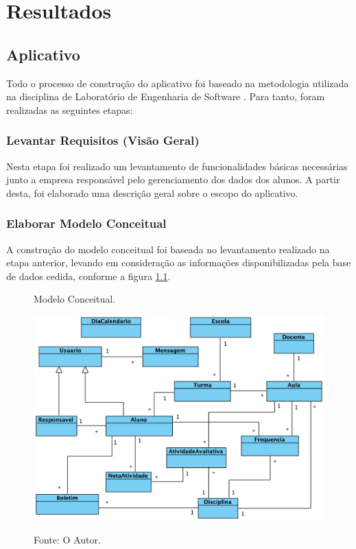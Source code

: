\chapter{\textbf{Resultados}} %
\sloppy %

\section{Aplicativo}

Todo o processo de construção do aplicativo foi baseado na metodologia utilizada na disciplina de Laboratório de Engenharia de Software \cite{rupLes}. Para tanto, foram realizadas as seguintes etapas:

\subsection{Levantar Requisitos (Visão Geral)}

Nesta etapa foi realizado um levantamento de funcionalidades básicas necessárias junto a empresa responsável pelo gerenciamento dos dados dos alunos. A partir desta, foi elaborado uma descrição geral sobre o escopo do aplicativo.

\subsection{Elaborar Modelo Conceitual}

A construção do modelo conceitual foi baseada no levantamento realizado na etapa anterior, levando em consideração as informações disponibilizadas pela base de dados cedida, conforme a figura \ref{figura:modelo_conceitual}.

\begin{figure}[H]
	\caption{Modelo Conceitual.}
	\centering %
	\includegraphics[width=13.7cm]{resources/modelo_conceitual.png} %
	\label{figura:modelo_conceitual}
	\captionsetup{singlelinecheck = false, format= hang, justification=raggedright, labelsep=space, width=13.7cm}
	\caption*{\footnotesize Fonte: O Autor.}
\end{figure}

